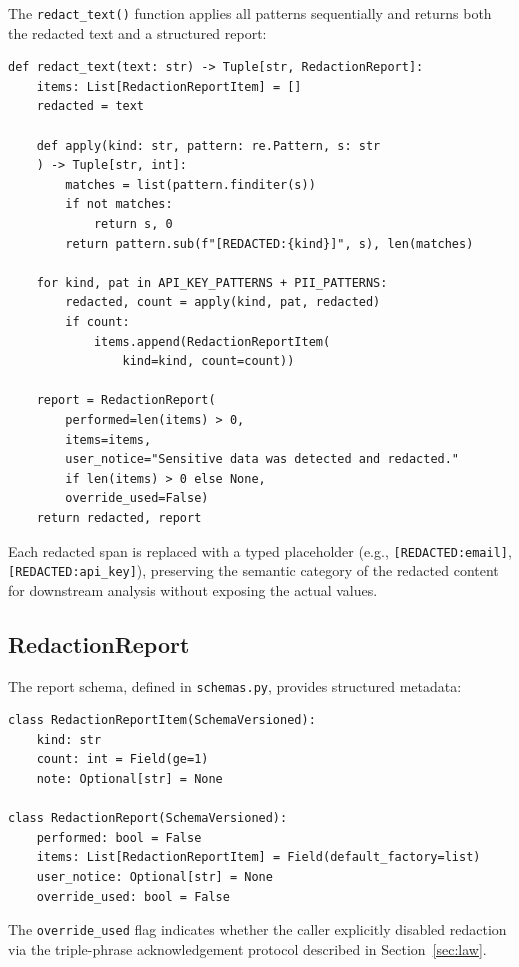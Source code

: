 \documentclass[11pt,a4paper]{article}
\theoremstyle{plain}
\theoremstyle{definition}
\begin{document}
The \texttt{redact\_text()} function applies all patterns sequentially and returns
both the redacted text and a structured report:

\begin{lstlisting}[style=pythonstyle, caption={redact\_text function from \texttt{redaction.py}}]
def redact_text(text: str) -> Tuple[str, RedactionReport]:
    items: List[RedactionReportItem] = []
    redacted = text

    def apply(kind: str, pattern: re.Pattern, s: str
    ) -> Tuple[str, int]:
        matches = list(pattern.finditer(s))
        if not matches:
            return s, 0
        return pattern.sub(f"[REDACTED:{kind}]", s), len(matches)

    for kind, pat in API_KEY_PATTERNS + PII_PATTERNS:
        redacted, count = apply(kind, pat, redacted)
        if count:
            items.append(RedactionReportItem(
                kind=kind, count=count))

    report = RedactionReport(
        performed=len(items) > 0,
        items=items,
        user_notice="Sensitive data was detected and redacted."
        if len(items) > 0 else None,
        override_used=False)
    return redacted, report
\end{lstlisting}

Each redacted span is replaced with a typed placeholder (e.g.,
\texttt{[REDACTED:email]}, \texttt{[REDACTED:api\_key]}), preserving the
semantic category of the redacted content for downstream analysis without
exposing the actual values.

\subsection{RedactionReport}

The report schema, defined in \texttt{schemas.py}, provides structured metadata:

\begin{lstlisting}[style=pythonstyle, caption={RedactionReport schema from \texttt{schemas.py}}]
class RedactionReportItem(SchemaVersioned):
    kind: str
    count: int = Field(ge=1)
    note: Optional[str] = None

class RedactionReport(SchemaVersioned):
    performed: bool = False
    items: List[RedactionReportItem] = Field(default_factory=list)
    user_notice: Optional[str] = None
    override_used: bool = False
\end{lstlisting}

The \texttt{override\_used} flag indicates whether the caller explicitly disabled
redaction via the triple-phrase acknowledgement protocol described in
Section~\ref{sec:law}.
\end{document}
